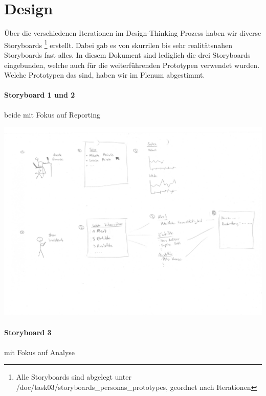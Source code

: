 \documentclass[a4paper]{scrreprt}
\begin{document}
\pagebreak

\section{Design}
Über die verschiedenen Iterationen im Design-Thinking Prozess haben wir diverse Storyboards \footnote{Alle Storyboards sind  abgelegt unter /doc/task03/storyboards\_personas\_prototypes, geordnet nach Iterationen} erstellt. Dabei gab es von skurrilen bis sehr realitätsnahen Storyboards fast alles. In diesem Dokument sind lediglich die drei Storyboards eingebunden, welche auch für die weiterführenden Prototypen verwendet wurden. Welche Prototypen das sind, haben wir im Plenum abgestimmt.

\paragraph{Storyboard 1 und 2} beide mit Fokus auf Reporting

\includegraphics[width=1\textwidth]{storyboards_personas_prototypes/iteration3/sidlm3_storyboard2+3.png}


\pagebreak

\paragraph{Storyboard 3} mit Fokus auf Analyse
\end{document}
